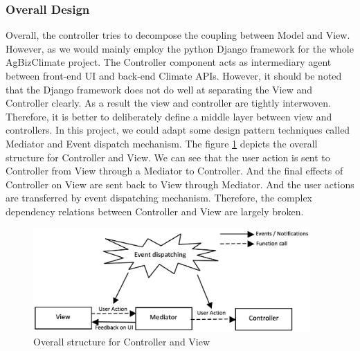 \documentclass[onecolumn, draftclsnofoot,10pt, compsoc]{article}
\begin{document}
			\subsubsection{Overall Design}
			Overall, the controller tries to decompose the coupling between Model and View. However, as we would mainly employ the python Django framework for the whole AgBizClimate project. The Controller component acts as intermediary agent between front-end UI and back-end Climate APIs. However, it should be noted that the Django framework does not do well at separating the View and Controller clearly. As a result the view and controller are tightly interwoven. Therefore, it is better to deliberately define a middle layer between view and controllers. In this project, we could adapt some design pattern techniques called Mediator and Event dispatch mechanism. The figure \ref{fig:Con} depicts the overall structure for Controller and View. We can see that the user action is sent to Controller from View through a Mediator to Controller. And the final effects of Controller on View are sent back to View through Mediator. And the user actions are transferred by event dispatching mechanism. Therefore, the complex dependency relations between Controller and View are largely broken.\\

	\begin{figure}[htb]
		\begin{center}
			\includegraphics[width=300pt]{UMLDiagrams/Controller.eps}
		\end{center}
		\caption{Overall structure for Controller and View}
		\label{fig:Con}
		\end{figure}
\end{document}

